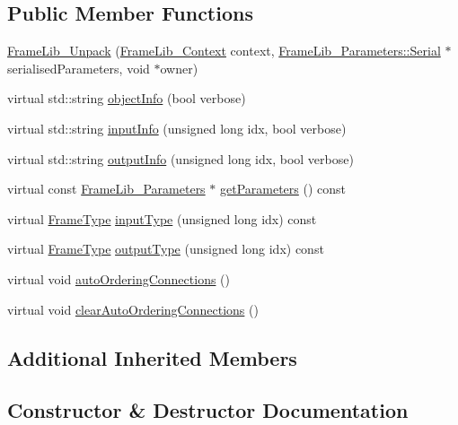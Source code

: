 \subsection*{Public Member Functions}
\begin{DoxyCompactItemize}
\item 
\hyperlink{class_frame_lib___unpack_a987b9186fb9ec69664610f3893063dcc}{Frame\+Lib\+\_\+\+Unpack} (\hyperlink{class_frame_lib___context}{Frame\+Lib\+\_\+\+Context} context, \hyperlink{class_frame_lib___parameters_1_1_serial}{Frame\+Lib\+\_\+\+Parameters\+::\+Serial} $\ast$serialised\+Parameters, void $\ast$owner)
\item 
virtual std\+::string \hyperlink{class_frame_lib___unpack_ab298a6feb7c051f3563a01caacd99c02}{object\+Info} (bool verbose)
\item 
virtual std\+::string \hyperlink{class_frame_lib___unpack_a1ee09b9d9ab16f598f3462d9b29533be}{input\+Info} (unsigned long idx, bool verbose)
\item 
virtual std\+::string \hyperlink{class_frame_lib___unpack_a7e9a710850c3d94d73d00ea27a90d494}{output\+Info} (unsigned long idx, bool verbose)
\item 
virtual const \hyperlink{class_frame_lib___parameters}{Frame\+Lib\+\_\+\+Parameters} $\ast$ \hyperlink{class_frame_lib___unpack_a10013cfecf3463d8961d65042e735055}{get\+Parameters} () const
\item 
virtual \hyperlink{_frame_lib___types_8h_ad495a9f61af7fff07d7e97979d1ab854}{Frame\+Type} \hyperlink{class_frame_lib___unpack_ac5053983d308b6c715ca2a59d4115ec8}{input\+Type} (unsigned long idx) const
\item 
virtual \hyperlink{_frame_lib___types_8h_ad495a9f61af7fff07d7e97979d1ab854}{Frame\+Type} \hyperlink{class_frame_lib___unpack_aa065a393363c5cc93d7d21dd4b1e6e1a}{output\+Type} (unsigned long idx) const
\item 
virtual void \hyperlink{class_frame_lib___unpack_a4bbf83c7d4bd8c96acd2283afa0ed2c2}{auto\+Ordering\+Connections} ()
\item 
virtual void \hyperlink{class_frame_lib___unpack_a99d42ef7daadceeda8e3aa34afb249f5}{clear\+Auto\+Ordering\+Connections} ()
\end{DoxyCompactItemize}
\subsection*{Additional Inherited Members}


\subsection{Constructor \& Destructor Documentation}
\mbox{\label{class_frame_lib___unpack_a987b9186fb9ec69664610f3893063dcc}} 
